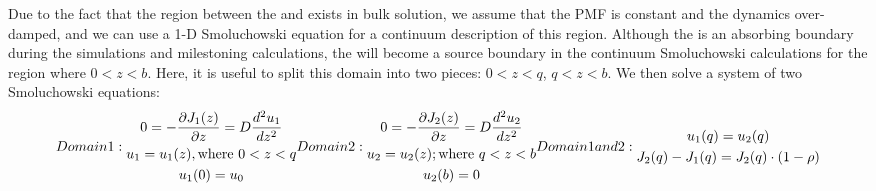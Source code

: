         \par Due to the fact that the region between the  and  exists in bulk solution, we assume that the PMF is constant and the dynamics over-damped, and we can use a 1-D Smoluchowski equation for a continuum description of this region. Although the  is an absorbing boundary during the simulations and milestoning calculations, the  will become a source boundary in the continuum Smoluchowski calculations for the region where $0<z<b$. Here, it is useful to split this domain into two pieces: $0<z<q$, $q<z<b$. We then solve a system of two Smoluchowski equations:\\
        \begin{subequations}\label{eq:smolsystem}
        Domain 1:
            \begin{gather}
                0 = -\parfrac{J_1(z)}{z} = D\frac{d^2u_1}{d z^2}\label{eq:smold1}\\
                u_1 = u_1(z), \textrm{where } 0<z<q \label{eq:u1s}\\
                u_1(0) = u_0\label{eq:boundary0}
            \end{gather}
        Domain 2:
            \begin{gather}
                0 = -\parfrac{J_2(z)}{z} = D\frac{d^2u_2}{d z^2}\label{eq:smold2}\\
                u_2 = u_2(z); \textrm{where } q<z<b \\
                u_2(b) = 0\label{eq:boundaryb}
            \end{gather}
        Domain 1 and 2:
            \begin{gather}
                u_1(q) = u_2(q)\label{eq:boundaryq}\\
                J_2(q) - J_1(q) = J_2(q)\cdot(1-\rho)\label{eq:diffflux}
            \end{gather}
        \end{subequations}

